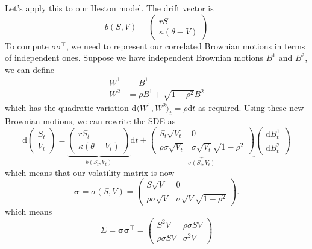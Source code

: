 Let’s apply this to our Heston model. The drift vector is
\begin{equation}
b(S, V) = \begin{pmatrix} rS \\ \kappa (\theta - V)\end{pmatrix}
\end{equation}
To compute $\sigma\sigma^\top$, we need to represent our correlated Brownian motions in terms of independent ones. Suppose we have independent Brownian motions $B^1$ and $B^2$, we can define
\begin{align}
W^1 &= B^1 \\
W^2 &= \rho B^1 + \sqrt {1-\rho^2}B^2
\end{align}
which has the quadratic variation $\mathrm d\langle W^1, W^2\rangle_t = \rho \mathrm dt$ as required. Using these new Brownian motions, we can rewrite the SDE as
\begin{equation}
\mathrm d \begin{pmatrix}
S_t \\ V_t
\end{pmatrix} = \underbrace{
\begin{pmatrix}
rS_t \\ \kappa(\theta - V_t)
\end{pmatrix}}_{b(S_t, V_t)}\mathrm dt +
\underbrace{\begin{pmatrix}
S_t \sqrt{V_t} & 0 \\
\rho\sigma\sqrt{V_t} & \sigma \sqrt{V_t}\sqrt{1 - \rho^2}
\end{pmatrix}
}_{\sigma(S_t, V_t)}
\begin{pmatrix}
\mathrm dB_t^{1} \\
\mathrm dB_t^{2}
\end{pmatrix}
\end{equation}
which means that our volatility matrix is now
\begin{equation}
\boldsymbol \sigma = \sigma(S, V) = \begin{pmatrix}
S\sqrt{V} & 0 \\
\rho\sigma\sqrt{V} & \sigma\sqrt{V}\sqrt{1-\rho^2}
\end{pmatrix}.
\end{equation}
which means
\begin{equation}
\Sigma = \boldsymbol\sigma\boldsymbol\sigma^\top = \begin{pmatrix}
S^2 V & \rho \sigma SV \\ \rho \sigma SV & \sigma^2 V \end{pmatrix}
\end{equation}

